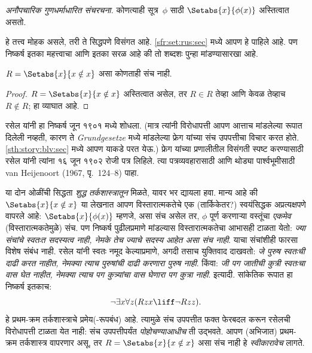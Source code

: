 \begin{defish}
  \emph{अनौपचारिक
  गुणधर्माधारित संचरचना.}
  कोणत्याही सूत्र~$\phi$
  साठी
  $\Setabs{x}{\phi(x)}$
  अस्तित्वात असतो.
\end{defish}

हे तत्त्व मोहक
असले, तरी ते
सिद्धपणे विसंगत
आहे. \ref{sfr:set:rus:sec}
मध्ये आपण हे
पाहिले आहे.
पण निष्कर्ष
इतका महत्त्वाचा
आणि इतका
सरळ आहे
की तो
शब्दशः पुन्हा
मांडण्यासारखा आहे.

\begin{thm}[रसेलची विरोधापत्ती]
$R = \Setabs{x}{x \notin x}$
असा कोणताही संच नाही.
\end{thm}

\begin{proof}
$R = \Setabs{x}{x \notin x}$
अस्तित्वात असेल, तर
$R \in R$ तेव्हा
आणि केवळ तेव्हाच
$R \notin R$;
हा व्याघात आहे.
\end{proof}

रसेल यांनी हा
निष्कर्ष जून १९०१
मध्ये शोधला. (मात्र
त्यांनी विरोधापत्ती
आपण आत्ताच
मांडलेल्या रूपात
दिलेली नव्हती,
कारण ते
\emph{Grundgesetze}
मध्ये मांडलेल्या
फ्रेग यांच्या
संच उपपत्तीचा
विचार करत होते.
\ref{sth:story:blv:sec}
मध्ये आपण
याकडे परत
येऊ.) फ्रेग
यांच्या प्रणालीतील
विसंगती स्पष्ट
करण्यासाठी रसेल
यांनी त्यांना
१६ जून १९०२
रोजी पत्र
लिहिले. त्या
पत्रव्यवहारासाठी
आणि थोड्या
पार्श्वभूमीसाठी
van Heijenoort (1967, पृ.~124--8)
पाहा.

या दोन ओळींची
सिद्धता \emph{शुद्ध
तर्कशास्त्रातून}
मिळते, यावर
भर द्यायला हवा.
मान्य आहे की
$\Setabs{x}{x \notin x}$
या लेखनात
आपण विस्तारात्मकतेचे
एक (तार्किकेतर?)
स्वयंसिद्धक अप्रत्यक्षपणे
वापरले आहे:
$\Setabs{x}{\phi(x)}$
म्हणजे, असा संच
असेल तर,
$\phi$ पूर्ण
करणाऱ्या वस्तूंचा
\emph{एकमेव}
(विस्तारात्मकतेमुळे)
संच. पण निष्कर्ष
पुढीलप्रमाणे
मांडल्यास
विस्तारात्मकतेचा
आभासही टाळता
येतो: \emph{ज्या
संचांचे स्वतःत
सदस्यत्व नाही,
नेमके तेच
ज्याचे सदस्य
आहेत असा
संच नाही}.
याचा संचांशीही
फारसा विशेष
संबंध नाही.
रसेल यांनी
स्वतः नमूद
केल्याप्रमाणे,
अगदी तसाच
युक्तिवाद
दाखवतो:
\emph{जे पुरुष
स्वतःची दाढी
करत नाहीत,
नेमक्या त्याच
पुरुषांची दाढी
करणारा पुरुष
नाही}. किंवा:
\emph{जी पग
जातीची कुत्री
स्वतःचा वास
घेत नाहीत,
नेमक्या त्याच
पग कुत्र्यांचा
वास घेणारा
पग कुत्रा
नाही}. इत्यादी.
सांकेतिक रूपात
हा निष्कर्ष
इतकाच:
\[
\lnot \exists x \forall z(Rzx \liff \lnot R zz).
\]
हे प्रथम-क्रम
तर्कशास्त्राचे
प्रमेय(-रूपबंध)
आहे. त्यामुळे
संच उपपत्तीत
फक्त फेरबदल
करून रसेलची
विरोधापत्ती
टाळता येत
नाही: संच
उपपत्तीपर्यंत
\emph{पोहोचण्याआधीच}
ती उद्भवते.
आपण (अभिजात)
प्रथम-क्रम
तर्कशास्त्र
वापरणार असू,
तर
$R = \Setabs{x}{x\notin x}$
असा संच नाही
हे \emph{स्वीकारावेच}
लागते.

